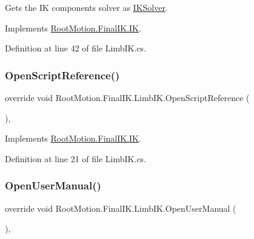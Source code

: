 Gets the IK component\textquotesingle{}s solver as \mbox{\hyperlink{class_root_motion_1_1_final_i_k_1_1_i_k_solver}{I\+K\+Solver}}. 



Implements \mbox{\hyperlink{class_root_motion_1_1_final_i_k_1_1_i_k_ad9ef393e69cd16ba2d6fa06ba06b7a66}{Root\+Motion.\+Final\+I\+K.\+IK}}.



Definition at line 42 of file Limb\+I\+K.\+cs.

\mbox{\label{class_root_motion_1_1_final_i_k_1_1_limb_i_k_a06dda0b6311aed7d024f2a286eb77c6c}} 
\subsubsection{\texorpdfstring{Open\+Script\+Reference()}{OpenScriptReference()}}
{\footnotesize\ttfamily override void Root\+Motion.\+Final\+I\+K.\+Limb\+I\+K.\+Open\+Script\+Reference (\begin{DoxyParamCaption}{ }\end{DoxyParamCaption})\hspace{0.3cm}{\ttfamily [protected]}, {\ttfamily [virtual]}}



Implements \mbox{\hyperlink{class_root_motion_1_1_final_i_k_1_1_i_k_a260f283903b1305b99485c9474c83927}{Root\+Motion.\+Final\+I\+K.\+IK}}.



Definition at line 21 of file Limb\+I\+K.\+cs.

\mbox{\label{class_root_motion_1_1_final_i_k_1_1_limb_i_k_a3f518043b978d7a162c7390b5b7c8ca3}} 
\subsubsection{\texorpdfstring{Open\+User\+Manual()}{OpenUserManual()}}
{\footnotesize\ttfamily override void Root\+Motion.\+Final\+I\+K.\+Limb\+I\+K.\+Open\+User\+Manual (\begin{DoxyParamCaption}{ }\end{DoxyParamCaption})\hspace{0.3cm}{\ttfamily [protected]}, {\ttfamily [virtual]}}



